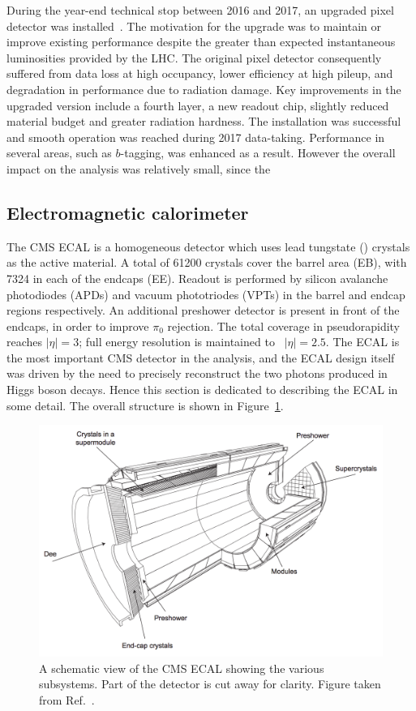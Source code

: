 During the year-end technical stop between 2016 and 2017, an upgraded pixel detector was installed~\cite{PixelUpgrade}.
The motivation for the upgrade was to maintain or improve existing performance despite the greater than expected instantaneous luminosities provided by the LHC.
The original pixel detector consequently suffered from data loss at high occupancy, lower efficiency at high pileup, and degradation in performance due to radiation damage.
Key improvements in the upgraded version include a fourth layer, a new readout chip, slightly reduced material budget and greater radiation hardness.
The installation was successful and smooth operation was reached during 2017 data-taking.
Performance in several areas, such as $b$-tagging, was enhanced as a result.
However the overall impact on the \Hgg analysis was relatively small, since the 

\subsection{Electromagnetic calorimeter}

The CMS ECAL is a homogeneous detector which uses lead tungstate (\pbw) crystals as the active material.
A total of 61200 crystals cover the barrel area (EB), with 7324 in each of the endcaps (EE).
Readout is performed by silicon avalanche photodiodes (APDs) and vacuum phototriodes (VPTs) in the barrel and endcap regions respectively.
An additional preshower detector is present in front of the endcaps, in order to improve $\pi_0$ rejection.
The total coverage in pseudorapidity reaches $|\eta|=3$; full energy resolution is maintained to ~$|\eta|=2.5$.
The ECAL is the most important CMS detector in the \Hgg analysis, 
and the ECAL design itself was driven by the need to precisely reconstruct the two photons produced in Higgs boson decays.
Hence this section is dedicated to describing the ECAL in some detail.
The overall structure is shown in Figure~\ref{fig:detector_ECALschematic}.

\begin{figure}[h!]
  \centering
  \includegraphics[width=\textwidth]{Figures/Detector/ECALschematic.png}
  \caption[Schematic view of the CMS ECAL.]
  {A schematic view of the CMS ECAL showing the various subsystems.
  Part of the detector is cut away for clarity.
  Figure taken from Ref.~\cite{ECALperformance}.}
  \label{fig:detector_ECALschematic}
\end{figure}

